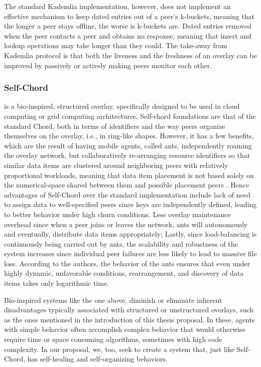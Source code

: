 \documentclass[runningheads]{llncs}
\begin{document}
The standard Kademlia implementation, however, does not implement an effective mechanism to keep dated entries out of a peer's k-buckets, meaning that the longer a peer stays offline, the worse is k-buckets are. Dated entries removed when the peer contacts a peer and obtains no response, meaning that insert and lookup operations may take longer than they could. The take-away from Kademlia protocol is that both the liveness and the freshness of an overlay can be improved by passively or actively making peers monitor each other.\newline

\subsubsection{Self-Chord} \cite{selfchord} is a bio-inspired, structured overlay, specifically designed to be used in cloud computing or grid computing architectures. Self-chord foundations are that of the standard Chord, both in terms of identifiers and the way peers organize themselves on the overlay, i.e., in ring-like shapes. However, it has a few benefits, which are the result of having mobile agents, called ants, independently roaming the overlay network, but collaboratively re-arranging resource identifiers so that similar data items are clustered around neighboring peers with relatively proportional workloads, meaning that data item placement is not based solely on the numerical-space shared between them and possible placement peers \cite{sotart, selfchord}. Hence advantages of Self-Chord over the standard implementation include lack of need to assign data to well-specified peers since keys are independently defined, leading to better behavior under high churn conditions. Less overlay maintenance overhead since when a peer joins or leaves the network, ants will autonomously and eventually, distribute data items appropriately; Lastly, since load-balancing is continuously being carried out by ants, the scalability and robustness of the system increases since individual peer failures are less likely to lead to massive file loss. According to the authors, the behavior of the ants ensures that even under highly dynamic, unfavorable conditions, rearrangement, and discovery of data items takes only logarithmic time.

Bio-inspired systems like the one above, diminish or eliminate inherent disadvantages typically associated with structured or unstructured overlays, such as the ones mentioned in the introduction of this thesis proposal. In these, agents with simple behavior often accomplish complex behavior that would otherwise require time or space consuming algorithms, sometimes with high code complexity. In our proposal, we, too, seek to create a system that, just like Self-Chord, has self-healing and self-organizing behaviors.
\end{document}
